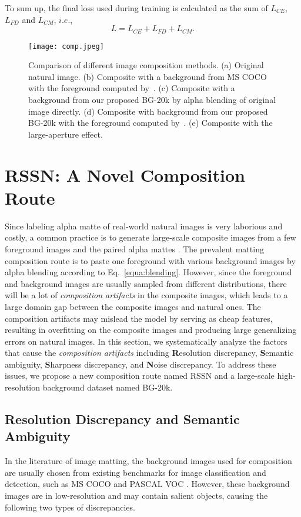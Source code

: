 \documentclass[twocolumn]{svjour3}
\begin{document}
To sum up, the final loss used during training is calculated as the sum of $L_{CE}$, $L_{FD}$ and $L_{CM}$, $i.e.$,
\begin{equation}
L = L_{CE} + L_{FD} + L_{CM}.
\end{equation}


\begin{figure*}[!t]
    \centering
    \texttt{[image: comp.jpeg]}
     \caption{Comparison of different image composition methods. (a) Original natural image. (b) Composite with a background from MS COCO~\citep{lin2014microsoft} with the foreground computed by~\citep{levin2007closed}. (c) Composite with a background from our proposed BG-20k by alpha blending of original image directly. (d) Composite with background from our proposed BG-20k with the foreground computed by~\citep{levin2007closed}. (e) Composite with the large-aperture effect.}
    \label{fig:composite}
\end{figure*}


\section{RSSN: A Novel Composition Route}
 
Since labeling alpha matte of real-world natural images is very laborious and costly, a common practice is to generate large-scale composite images from a few foreground images and the paired alpha mattes \citep{xu2017deep}. The prevalent matting composition route is to paste one foreground with various background images by alpha blending according to Eq.~\eqref{equa:blending}. However, since the foreground and background images are usually sampled from different distributions, there will be a lot of \emph{composition artifacts} in the composite images, which leads to a large domain gap between the composite images and natural ones. The composition artifacts may mislead the model by serving as cheap features, resulting in overfitting on the composite images and producing large generalizing errors on natural images. In this section, we systematically analyze the factors that cause the \emph{composition artifacts} including \textbf{R}esolution discrepancy, \textbf{S}emantic ambiguity, \textbf{S}harpness discrepancy, and \textbf{N}oise discrepancy. To address these issues, we propose a new composition route named RSSN and a large-scale high-resolution background dataset named BG-20k.

 
\subsection{Resolution Discrepancy and Semantic Ambiguity}
\label{section: bg20k}
In the literature of image matting, the background images used for composition are usually chosen from existing benchmarks for image classification and detection, such as MS COCO \citep{lin2014microsoft} and PASCAL VOC \citep{everingham2010pascal}. However, these background images are in low-resolution and may contain salient objects, causing the following two types of discrepancies.
\end{document}
